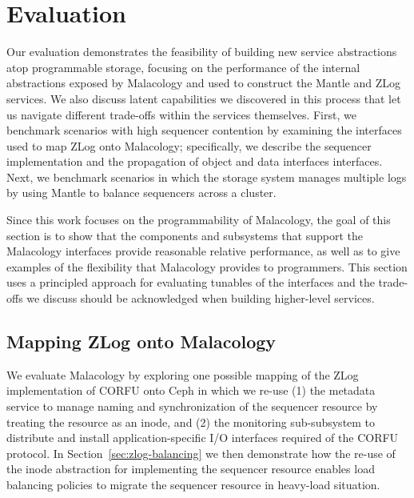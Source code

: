 \section{Evaluation}
\label{sec:evaluation} 


Our evaluation demonstrates the feasibility of building new service
abstractions atop programmable storage, focusing on the performance of the
internal abstractions exposed by Malacology and used to construct the Mantle
and ZLog services. We also discuss latent capabilities we discovered in this
process that let us navigate different trade-offs within the services
themselves. First, we benchmark scenarios with high sequencer contention by
examining the interfaces used to map ZLog onto Malacology; specifically, we
describe the sequencer implementation and the propagation of object and data
interfaces interfaces.  Next, we benchmark scenarios in which the storage
system manages multiple logs by using Mantle to balance sequencers across a
cluster.


Since this work focuses on the programmability of Malacology, the goal of this
section is to show that the components and subsystems that support the
Malacology interfaces provide reasonable relative performance, as well as to
give examples of the flexibility that Malacology provides to programmers.  
This section uses a principled approach for evaluating tunables of the
interfaces and the trade-offs we discuss should be acknowledged when building
higher-level services.


\subsection{Mapping ZLog onto Malacology}
\label{sec:mapping-zlog-onto-malacology}

We evaluate Malacology by exploring one possible mapping of the ZLog
implementation of CORFU onto Ceph in which we re-use (1) the metadata service
to manage naming and synchronization of the sequencer resource by treating the
resource as an inode, and (2) the monitoring sub-subsystem to distribute and
install application-specific I/O interfaces required of the CORFU protocol. In
Section~\ref{sec:zlog-balancing} we then demonstrate how the re-use of the
inode abstraction for implementing the sequencer resource enables load
balancing policies to migrate the sequencer resource in heavy-load situation.

